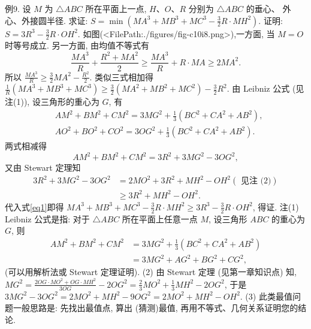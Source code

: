 例9. 设 $M$ 为 $\triangle A B C$ 所在平面上一点, $H 、 O 、 R$ 分别为 $\triangle A B C$ 的垂心、 外心、外接圆半径.
求证: $S=\min \left(M A^3+M B^3+M C^3-\frac{3}{2} R \cdot M H^2\right)$.
证明:$S=3 R^3-\frac{3}{2} R \cdot O H^2$.
如图(<FilePath:./figures/fig-c10i8.png>),一方面, 当 $M=O$ 时等号成立.
另一方面, 由均值不等式有
$$
\frac{M A^3}{R}+\frac{R^2+M A^2}{2} \geqslant \frac{M A^3}{R}+R \cdot M A \geqslant 2 M A^2 .
$$
所以 $\frac{M A^3}{R} \geqslant \frac{3}{2} M A^2-\frac{R^2}{2}$.
类似三式相加得 $\frac{1}{R}\left(M A^3+M B^3+M C^3\right) \geqslant \frac{3}{2}\left(M A^2+M B^2+M C^2\right)- \frac{3}{2} R^2$. \label{eq1}
由 Leibniz 公式 (见注(1)), 设三角形的重心为 $G$, 有
$$
\begin{aligned}
& A M^2+B M^2+C M^2=3 M G^2+\frac{1}{3}\left(B C^2+C A^2+A B^2\right), \\
& A O^2+B O^2+C O^2=3 O G^2+\frac{1}{3}\left(B C^2+C A^2+A B^2\right) .
\end{aligned}
$$
两式相减得
$$
A M^2+B M^2+C M^2=3 R^2+3 M G^2-3 O G^2,
$$
又由 Stewart 定理知
$$
\begin{aligned}
3 R^2+3 M G^2-3 O G^2 & =2 M O^2+3 R^2+M H^2-O H^2 (\text { 见注 (2)} )\\
& \geqslant 3 R^2+M H^2-O H^2 .
\end{aligned}
$$
代入式\ref{eq1}即得 $M A^3+M B^3+M C^3-\frac{3}{2} R \cdot M H^2 \geqslant 3 R^3-\frac{3}{2} R \cdot O H^2$, 得证.
注(1) Leibniz 公式是指: 对于 $\triangle A B C$ 所在平面上任意一点 $M$, 设三角形 $A B C$ 的重心为 $G$, 则
$$
\begin{aligned}
A M^2+B M^2+C M^2 & =3 M G^2+\frac{1}{3}\left(B C^2+C A^2+A B^2\right) \\
& =3 M G^2+A G^2+B G^2+C G^2,
\end{aligned}
$$
(可以用解析法或 Stewart 定理证明).
(2) 由 Stewart 定理 (见第一章知识点) 知, $M G^2= \frac{2 O G \cdot M O^2+O G \cdot M H^2}{3 O G}-2 O G^2=\frac{2}{3} M O^2+\frac{1}{3} M H^2-2 O G^2$, 于是 $3 M G^2- 3 O G^2=2 M O^2+M H^2-9 O G^2=2 M O^2+M H^2-O H^2$.
(3) 此类最值问题一般思路是: 先找出最值点, 算出 (猜测)最值, 再用不等式、几何关系证明您的结论.



